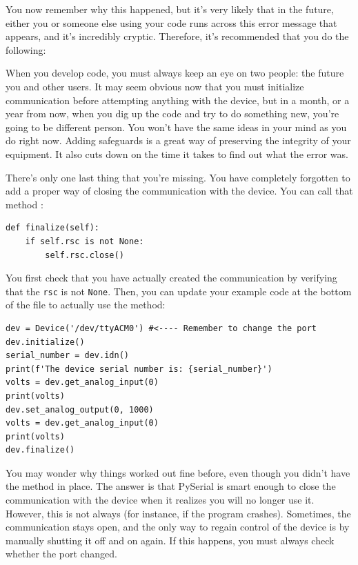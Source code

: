 You now remember why this happened, but it's very likely that in the future, either you or someone else using your code runs across this error message that appears, and it's incredibly cryptic. Therefore, it's recommended that you do the following:


When you develop code, you must always keep an eye on two people: the future you and other users. It may seem obvious now that you must initialize communication before attempting anything with the device, but in a month, or a year from now, when you dig up the code and try to do something new, you're going to be different person. You won't have the same ideas in your mind as you do right now. Adding safeguards is a great way of preserving the integrity of your equipment. It also cuts down on the time it takes to find out what the error was.

There's only one last thing that you're missing. You have completely forgotten to add a proper way of closing the communication with the device. You can call that method :

\begin{verbatim}
def finalize(self):
    if self.rsc is not None:
        self.rsc.close()
\end{verbatim}

You first check that you have actually created the communication by verifying that the \texttt{rsc} is not \texttt{None}. Then, you can update your example code at the bottom of the file to actually use the  method:

\begin{verbatim}
dev = Device('/dev/ttyACM0') #<---- Remember to change the port
dev.initialize()
serial_number = dev.idn()
print(f'The device serial number is: {serial_number}')
volts = dev.get_analog_input(0)
print(volts)
dev.set_analog_output(0, 1000)
volts = dev.get_analog_input(0)
print(volts)
dev.finalize()
\end{verbatim}

You may wonder why things worked out fine before, even though you didn't have the  method in place. The answer is that PySerial is smart enough to close the communication with the device when it realizes you will no longer use it. However, this is not always (for instance, if the program crashes). Sometimes, the communication stays open, and the only way to regain control of the device is by manually shutting it off and on again. If this happens, you must always check whether the port changed.

